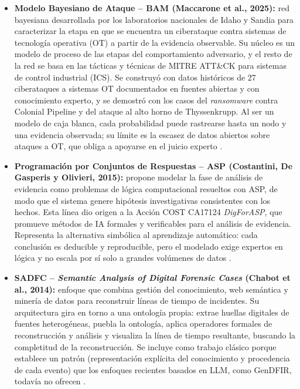 \documentclass[journal]{IEEEtran}
\begin{document}
\begin{itemize}
    \item \textbf{Modelo Bayesiano de Ataque -- BAM (Maccarone et al., 2025):} red bayesiana desarrollada por los laboratorios nacionales de Idaho y Sandia para caracterizar la etapa en que se encuentra un ciberataque contra sistemas de tecnología operativa (OT) a partir de la evidencia observable. Su núcleo es un modelo de proceso de las etapas del comportamiento adversario, y el resto de la red se basa en las tácticas y técnicas de MITRE ATT\&CK para sistemas de control industrial (ICS). Se construyó con datos históricos de 27 ciberataques a sistemas OT documentados en fuentes abiertas y con conocimiento experto, y se demostró con los casos del \textit{ransomware} contra Colonial Pipeline y del ataque al alto horno de Thyssenkrupp. Al ser un modelo de caja blanca, cada probabilidad puede rastrearse hasta un nodo y una evidencia observada; su límite es la escasez de datos abiertos sobre ataques a OT, que obliga a apoyarse en el juicio experto \cite{MaccaroneLeeT.2025IACi}.
    \item \textbf{Programación por Conjuntos de Respuestas -- ASP (Costantini, De Gasperis y Olivieri, 2015):} propone modelar la fase de análisis de evidencia como problemas de lógica computacional resueltos con ASP, de modo que el sistema genere hipótesis investigativas consistentes con los hechos. Esta línea dio origen a la Acción COST CA17124 \textit{DigForASP}, que promueve métodos de IA formales y verificables para el análisis de evidencia. Representa la alternativa simbólica al aprendizaje automático: cada conclusión es deducible y reproducible, pero el modelado exige expertos en lógica y no escala por sí solo a grandes volúmenes de datos \cite{CostantiniStefania2015DFEA}.
    \item \textbf{SADFC -- \textit{Semantic Analysis of Digital Forensic Cases} (Chabot et al., 2014):} enfoque que combina gestión del conocimiento, web semántica y minería de datos para reconstruir líneas de tiempo de incidentes. Su arquitectura gira en torno a una ontología propia: extrae huellas digitales de fuentes heterogéneas, puebla la ontología, aplica operadores formales de reconstrucción y análisis y visualiza la línea de tiempo resultante, buscando la completitud de la reconstrucción. Se incluye como trabajo clásico porque establece un patrón (representación explícita del conocimiento y procedencia de cada evento) que los enfoques recientes basados en LLM, como GenDFIR, todavía no ofrecen \cite{ChabotYoan2014Acfk}.
\end{itemize}
\end{document}
